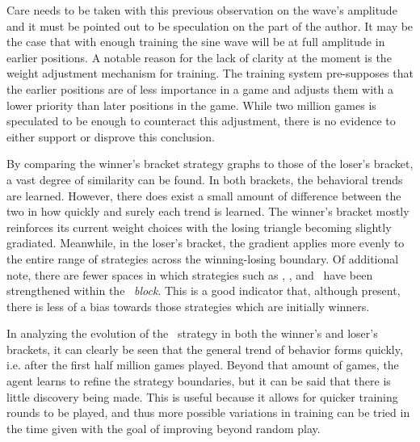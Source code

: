 Care needs to be taken with this previous observation on the wave's amplitude
and it must be pointed out to be speculation on the part of the author.
%
It may be the case that with enough training the sine wave will be at full
amplitude in earlier positions.
%
A notable reason for the lack of clarity at the moment is the weight adjustment
mechanism for training.
%
The training system pre-supposes that the earlier positions are of less
importance in a game and adjusts them with a lower priority than later positions
in the game.
%
While two million games is speculated to be enough to counteract this
adjustment,
there is no evidence to either support or disprove this conclusion.





By comparing the winner's bracket strategy graphs to those of the loser's
bracket,
a vast degree of similarity can be found.
%
In both brackets,
the behavioral trends are learned.
%
However,
there does exist a small amount of difference between the two
in how quickly and surely each trend is learned.
%
The winner's bracket mostly reinforces its current weight choices
with the losing triangle becoming slightly gradiated.
Meanwhile,
in the loser's bracket,
the gradient applies more evenly to the entire range of strategies
across the winning-losing boundary.
%
Of additional note,
there are fewer spaces in which
strategies such as \cribminavg, \peggingmaxavggained, and \peggingminavggiven\ 
have been strengthened within the \handmaxmin\ \textit{block}.
%
This is a good indicator that,
although present,
there is less of a bias towards those strategies which are initially winners.




In analyzing the evolution of the \handmaxavg\ strategy in both the winner's
and loser's brackets,
it can clearly be seen that the general trend of behavior forms
quickly,
i.e. after the first half million games played.
%
Beyond that amount of games,
the agent learns to refine the strategy boundaries,
but it can be said that there is little discovery being made.
%
This is useful because it allows for quicker training rounds to be played,
and thus more possible variations in training can be tried in the time given
with the goal of improving beyond random play.












